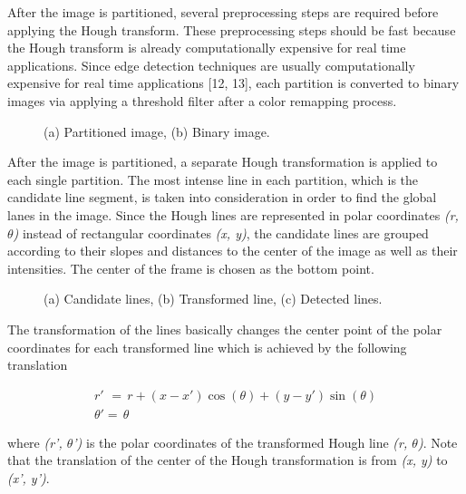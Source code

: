 \documentclass{ws-procs9x6}
\begin{document}
\noindent After the image is partitioned, several preprocessing steps are required before applying the Hough transform. These preprocessing steps should be fast because the Hough transform is already computationally expensive for real time applications. Since edge detection techniques are usually computationally expensive for real time applications [12, 13], each partition is converted to binary images via applying a threshold filter after a color remapping process. 

\begin{figure}
\begin{center}
\end{center}
\caption{(a) Partitioned image, (b) Binary image.}
\label{aba:fig1}
\end{figure} 

\noindent After the image is partitioned, a separate Hough transformation is applied to each single partition. The most intense line in each partition, which is the candidate line segment, is taken into consideration in order to find the global lanes in the image. Since the Hough lines are represented in polar coordinates \textit{(r, $\theta $)} instead of rectangular coordinates \textit{(x, y)}, the candidate lines are grouped according to their slopes and distances to the center of the image as well as their intensities. The center of the frame is chosen as the bottom point. 

\begin{figure}
\begin{center}
\end{center}
\caption{(a) Candidate lines, (b) Transformed line, (c) Detected lines.}
\label{aba:fig2}
\end{figure} 

\noindent The transformation of the lines basically changes the center point of the polar coordinates for each transformed line which is achieved by the following translation

\begin{equation} \label{GrindEQ__1_} 
\begin{array}{l} {r'\, \, =\, r+(x-x')\cos (\theta )+(y-y')\sin (\theta )} \\ {\theta '=\, \theta } \end{array} 
\end{equation} 


\noindent where \textit{(r', $\theta $')} is the polar coordinates of the transformed Hough line \textit{(r, $\theta $)}. Note that the translation of the center of the Hough transformation is from \textit{(x, y)} to \textit{(x', y')}. 
\end{document}
